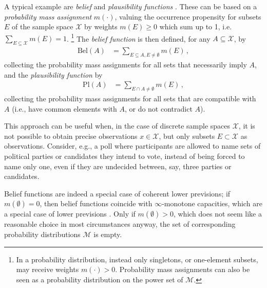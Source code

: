 
A typical example are \emph{belief} and \emph{plausibility functions}
\parencite[see, e.g.,][\S 2]{itip-other}.
These can be based on a \emph{probability mass assignment} $m(\cdot)$,
valuing the occurrence propensity for subsets $E$ of the sample space $\mathcal{X}$
by weights $m(E) \ge 0$ which sum up to 1, i.e. $\sum_{E \subseteq \mathcal{X}} m(E) = 1$.%
\footnote{In a probability distribution, instead only singletons,
or one-element subsets, may receive weights $m(\cdot) > 0$.
Probability mass assignments can also be seen as a probability distribution on the
power set of $\mathcal{M}$.}
The \emph{belief function} is then defined, for any $A \subseteq \mathcal{X}$, by
\begin{align*}
\text{Bel}(A) &= \sum_{E \subseteq A, E \neq \emptyset} m(E)\,,
\end{align*}
collecting the probability mass assignments for all sets that necessarily imply $A$,
and the \emph{plausibility function} by
\begin{align*}
\text{Pl}(A) &= \sum_{E \cap A \neq \emptyset} m(E)\,,
\end{align*}
collecting the probability mass assignments for all sets that are compatible with $A$
(i.e., have common elements with $A$, or do not contradict $A$).

This approach can be useful when,
in the case of discrete sample spaces $\mathcal{X}$,
it is not possible to obtain
precise observations $x \in \mathcal{X}$,
but only subsets $E \subset \mathcal{X}$ as observations.
Consider, e.g., a poll where participants 
are allowed to name sets of political parties or candidates they intend to vote,
instead of being forced to name only one, even if they are undecided between, say, three parties or candidates.

Belief functions are indeed a special case of coherent lower previsions;
if $m(\emptyset) = 0$, then belief functions coincide with $\infty$-monotone capacities,
which are a special case of lower previsions \parencite[e.g.,][\S 2.1]{itip-other}.
Only if $m(\emptyset) > 0$, which does not seem like a reasonable choice in most circumstances anyway,
the set of corresponding probability distributions $\mathcal{M}$ is empty.

